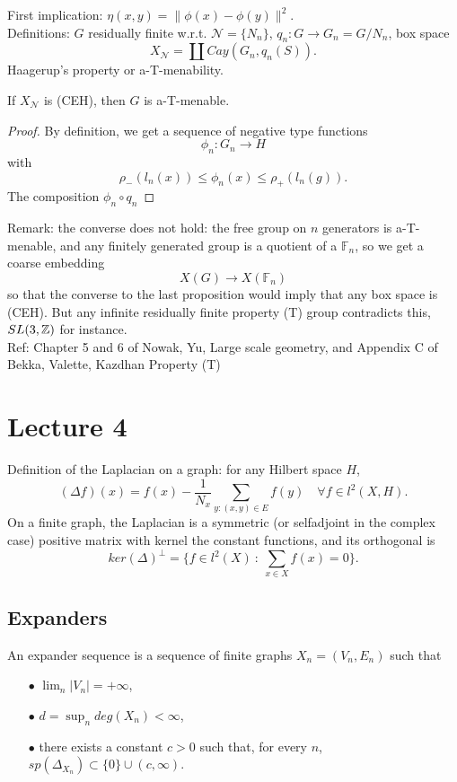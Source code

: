 First implication: $\eta(x,y) = \| \phi(x) - \phi(y)\|^2$.\\

Definitions: $G$ residually finite w.r.t. $\mathcal N = \{N_n\}$, $q_n: G \rightarrow G_n = G/N_n$, box space
\[X_{\mathcal N} = \coprod Cay(G_n, q_n(S)).\]
Haagerup's property or a-T-menability.

\begin{prop}
If $X_{\mathcal N}$ is (CEH), then $G$ is a-T-menable.
\end{prop}

\begin{proof}
By definition, we get a sequence of negative type functions 
\[\phi_n : G_n \rightarrow H\]
with 
\[\rho_-(l_n(x)) \leq \phi_n(x) \leq \rho_+(l_n(g)).\]
The composition $\phi_n\circ q_n$
\end{proof}

Remark: the converse does not hold: the free group on $n$ generators is a-T-menable, and any finitely generated group is a quotient of a $\mathbb F_n$, so we get a coarse embedding
\[X(G) \rightarrow X(\mathbb F_n)\]
so that the converse to the last proposition would imply that any box space is (CEH). But any infinite residually finite property (T) group contradicts this, $SL(3,\mathbb Z)$ for instance.\\

Ref: Chapter 5 and 6 of Nowak, Yu, Large scale geometry, and Appendix C of Bekka, Valette, Kazdhan Property (T)

\section{Lecture 4}

Definition of the Laplacian on a graph: for any Hilbert space $H$,
\[(\Delta f)(x) = f(x) - \frac{1}{N_x}\sum_{y : (x,y)\in E} f(y)\quad \forall f\in l^2(X,H).\]
On a finite graph, the Laplacian is a symmetric (or selfadjoint in the complex case) positive matrix with kernel the constant functions, and its orthogonal is 
\[ker(\Delta)^\perp = \{ f\in l^2(X) \ : \ \sum_{x\in X} f(x) = 0\}.\]

\subsection{Expanders}

\begin{definition}
An expander sequence is a sequence of finite graphs $X_n= (V_n, E_n)$ such that 
\begin{itemize}
\item[$\bullet$] $\lim_n |V_n| = +\infty $,
\item[$\bullet$] $d=\sup_n deg(X_n)< \infty$,
\item[$\bullet$] there exists a constant $c>0$ such that, for every $n$, $sp(\Delta_{X_n}) \subset \{0\} \cup (c,\infty)$.
\end{itemize}
\end{definition} 

